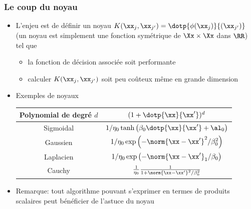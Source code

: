 \documentclass[9pt,table]{beamer} %
\begin{document}
\begin{frame}
\frametitle{Le coup du noyau}

\begin{itemize}[label=\tiny$\blacksquare$]
	\item L'enjeu est de définir un noyau $K(\xx_j,\xx_{j'}) = \dotp{\phi(\xx_j)}{(\xx_{j'})}$ (un noyau est simplement une fonction symétrique de $\Xx \times \Xx$ dans $\RR$) tel que
	\begin{itemize}[label=-]
		\item la fonction de décision associée soit performante
		\item calculer $K(\xx_j,\xx_{j'})$ soit peu coûteux même en grande dimension
	\end{itemize}
		
	\item Exemples de noyaux
	\vfill
	\begin{center}
	\begin{tabular}{c|c}
		Polynomial de degré $d$ & $(1 + \dotp{\xx}{\xx'})^d$\\
		\hline
		Sigmoidal & $1/\eta_0 \tanh\left(\beta_0\dotp{\xx}{\xx'}+\al_0\right)$\\
		\hline 
		\hline
		Gaussien & $1/\eta_0 \exp\left(-\norm{\xx-\xx'}^2/\beta_0^2\right)$\\
		\hline
		Laplacien & $1/\eta_0 \exp\left(-\norm{\xx-\xx'}_1/\beta_0\right)$\\
		\hline
		Cauchy & $\frac{1}{\eta_0} \frac{1}{1+\norm{\xx-\xx'}^2/\beta_0^2}$
	\end{tabular}
	\end{center}
	
	\item Remarque: tout algorithme pouvant s'exprimer en termes de produits scalaires peut bénéficier de l'astuce du noyau
\end{itemize}
	
\end{frame}






%
%
\end{document}
